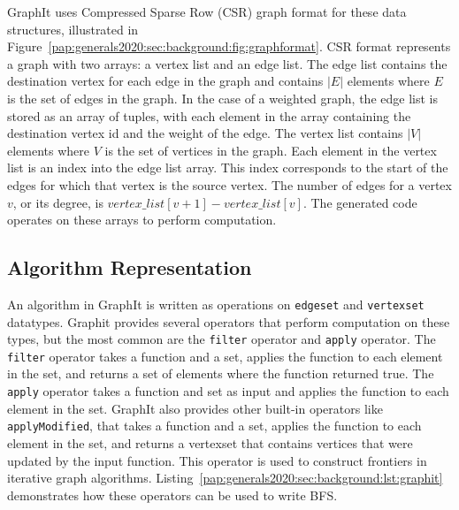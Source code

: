 GraphIt uses Compressed Sparse Row (CSR) graph format for these data structures, illustrated in Figure~\ref{pap:generals2020:sec:background:fig:graphformat}.
CSR format represents a graph with two arrays: a vertex list and an edge list.
The edge list contains the destination vertex for each edge in the graph and contains $|E|$ elements where $E$ is the set of edges in the graph.
In the case of a weighted graph, the edge list is stored as an array of tuples, with each element in the array containing the destination vertex id and the weight of the edge.
The vertex list contains $|V|$ elements where $V$ is the set of vertices in the graph. 
Each element in the vertex list is an index into the edge list array.
This index corresponds to the start of the edges for which that vertex is the source vertex.
The number of edges for a vertex $v$, or its degree, is $vertex\_list[v+1] - vertex\_list[v]$.
The generated code operates on these arrays to perform computation.

\graphformatfig


\subsection{Algorithm Representation}
An algorithm in GraphIt is written as operations on \lstinline[language=graphit]{edgeset} and \lstinline[language=graphit]{vertexset} datatypes. 
Graphit provides several operators that perform computation on these types, but the most common are the \lstinline[language=graphit]{filter} operator and \lstinline[language=graphit]{apply} operator.
The \lstinline[language=graphit]{filter} operator takes a function and a set, applies the function to each element in the set, and returns a set of elements where the function returned true.
The \lstinline[language=graphit]{apply} operator takes a function and set as input and applies the function to each element in the set. %
GraphIt also provides other built-in operators like \lstinline[language=graphit]{applyModified}, that takes a function and a set, applies the function to each element in the set, and returns a vertexset that contains vertices that were updated by the input function. 
This operator is used to construct frontiers in iterative graph algorithms. 
Listing~\ref{pap:generals2020:sec:background:lst:graphit} demonstrates how these operators can be used to write BFS.

